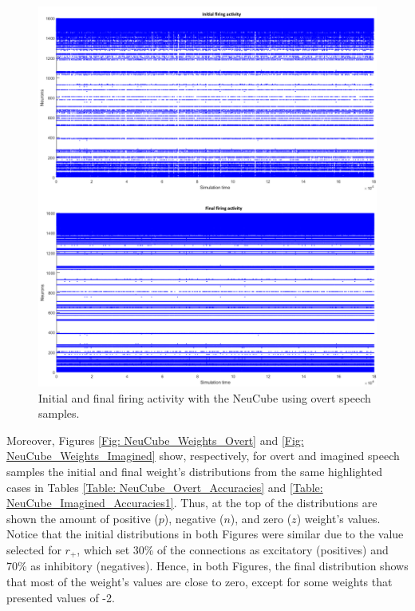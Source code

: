\begin{figure}[h!]
\centering
\includegraphics[width=\linewidth]{Figures/NeuCube_FA_Overt.png}
\caption{Initial and final firing activity with the NeuCube using overt speech samples.}
\label{Fig: NeuCube_FA_Overt}
\end{figure}

Moreover, Figures \ref{Fig: NeuCube_Weights_Overt} and \ref{Fig: NeuCube_Weights_Imagined} show, respectively, for overt and imagined speech samples the initial and final weight's distributions from the same highlighted cases in Tables \ref{Table: NeuCube_Overt_Accuracies} and \ref{Table: NeuCube_Imagined_Accuracies1}.  Thus, at the top of the distributions are shown the amount of positive ($p$), negative ($n$), and zero ($z$) weight's values.\\

Notice that the initial distributions in both Figures were similar due to the value selected for $r_{+}$, which set 30\% of the connections as excitatory (positives) and 70\% as inhibitory (negatives). Hence, in both Figures, the final distribution shows that most of the weight's values are close to zero, except for some weights that presented values of -2.\\

